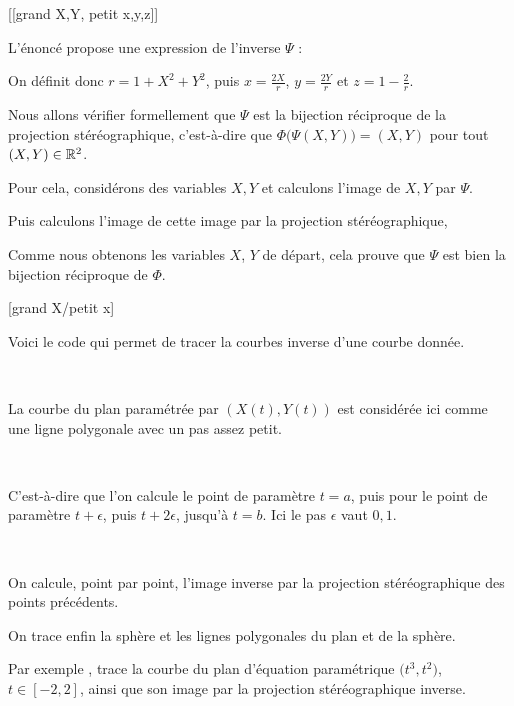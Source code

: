 

\diapo

[[grand X,Y, petit x,y,z]]


L'énoncé propose une expression de l'inverse $\Psi$ :

On définit donc $r=1+X^2+Y^2$, puis $\displaystyle x=\frac{2X}{r}$, $\displaystyle y=\frac{2Y}{r}$ et $\displaystyle z=1-\frac{2}{r}$.


\change
Nous allons vérifier formellement que $\Psi$ est la bijection réciproque de la projection stéréographique, c'est-à-dire que 
$\Phi\big( \Psi(X,Y) \big) = (X,Y)$ pour tout $(X,Y) \in \mathbb{R}^2$.
  
  
\change
Pour cela, considérons des variables $X,Y$ et calculons l'image de $X,Y$ par $\Psi$.
  
Puis calculons l'image de cette image par la projection stéréographique,

\change  
Comme nous obtenons les variables $X$, $Y$ de départ, cela prouve 
que $\Psi$ est bien la bijection réciproque de $\Phi$. 

\diapo


[grand X/petit x]

 Voici le code qui permet de tracer la courbes inverse d'une courbe donnée.
 
~
 
La courbe du plan paramétrée par $(X(t),Y(t))$ est considérée ici comme une ligne polygonale avec un pas assez petit.


~

C'est-à-dire que l'on calcule le point de paramètre $t=a$,
puis pour le point de paramètre $t+\epsilon$, puis $t+2\epsilon$, jusqu'à $t=b$. Ici le pas $\epsilon$ vaut $0,1$. 
  
  
~

 On calcule, point par point, l'image inverse par la projection stéréographique des points précédents.
 
  
 On trace enfin la sphère et les lignes polygonales du plan et de la sphère.

\change
 Par exemple , trace la courbe
 du plan d'équation paramétrique $\big(t^3,t^2\big)$, $t\in[-2,2]$, ainsi
 que son image par la projection stéréographique inverse.
\diapo

